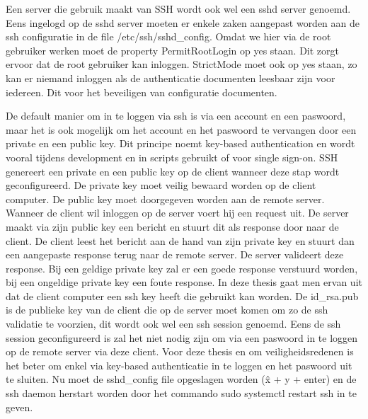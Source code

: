         Een server die gebruik maakt van SSH wordt ook wel een sshd server genoemd. Eens ingelogd op de sshd server moeten er enkele zaken aangepast worden aan de ssh configuratie in de file /etc/ssh/sshd\_config. Omdat we hier via de root gebruiker werken moet de property PermitRootLogin op yes staan. Dit zorgt ervoor dat de root gebruiker kan inloggen.
        StrictMode moet ook op yes staan, zo kan er niemand inloggen als de authenticatie documenten leesbaar zijn voor iedereen. Dit voor het beveiligen van configuratie documenten. %
        
        De default manier om in te loggen via ssh is via een account en een paswoord, maar het is ook mogelijk om het account en het paswoord te vervangen door een private en een public key. Dit principe noemt key-based authentication en wordt vooral tijdens development en in scripts gebruikt of voor single sign-on. SSH genereert een private en een public key op de client wanneer deze stap wordt geconfigureerd. De private key moet veilig bewaard worden op de client computer. De public key moet doorgegeven worden aan de remote server. Wanneer de client wil inloggen op de server voert hij een request uit. De server maakt via zijn public key een bericht en stuurt dit als response door naar de client. De client leest het bericht aan de hand van zijn private key en stuurt dan een aangepaste response terug naar de remote server. De server valideert deze response. Bij een geldige private key zal er een goede response verstuurd worden, bij een ongeldige private key een foute response.
        In deze thesis gaat men ervan uit dat de client computer een ssh key heeft die gebruikt kan worden. %
        De id\_rsa.pub is de publieke key van de client die op de server moet komen om zo de ssh validatie te voorzien, dit wordt ook wel een ssh session genoemd. Eens de ssh session geconfigureerd is zal het niet nodig zijn om via een paswoord in te loggen op de remote server via deze client.
        Voor deze thesis en om veiligheidsredenen is het beter om enkel via key-based authenticatie in te loggen en het paswoord uit te sluiten.
        Nu moet de sshd\_config file opgeslagen worden (\^x + y + enter) en de ssh daemon herstart worden door het commando sudo systemctl restart ssh in te geven.
        
